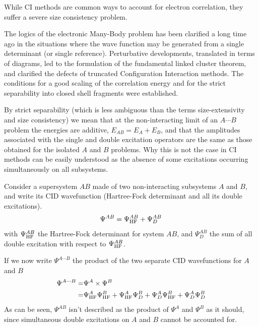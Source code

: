 \documentclass[./thesis.tex]{subfiles}
\begin{document}
\label{chap:exp_dressing}

While CI methods are common ways to account for electron correlation, they suffer a severe size consistency problem.


The logics of the electronic Many-Body problem has been clarified a long time
ago in the situations where  the  wave  function  may  be  generated  from  a
single  determinant  (or  single  reference).  Perturbative  developments,
translated  in  terms  of  diagrams,  led  to  the  formulation  of  the
fundamental  linked  cluster  theorem,\cite{Goldstone}  and  clarified  the  defects  of
truncated  Configuration Interaction  methods.  The  conditions  for  a  good
scaling  of  the  correlation  energy  and  for  the  strict separability  into
closed  shell  fragments  were  established.

By  strict  separability  (which
is  less ambiguous than the terms size-extensivity and size consistency) we
mean that at the non-interacting limit of an $A\cdots B$ problem the energies are
additive, $E_{AB} = E_A+E_B$, and that the amplitudes associated with the single
and  double excitation operators  are  the  same  as  those  obtained  for  the  isolated  $A$
and  $B$  problems.  
Why this is not the case in CI methods can be easily understood as the absence of some excitations occurring simultaneously on all subsystems.

Consider a supersystem $AB$ made of two non-interacting subsystems $A$ and $B$, and write its CID wavefunction (Hartree-Fock determinant and all its double excitations).
\begin{equation}
\Psi^{AB} = \Psi_{{\text{HF}}}^{AB} + \Psi_{D}^{AB}
\end{equation}
with $\Psi_{{\text{HF}}}^{AB}$ the Hartree-Fock determinant for system $AB$, and $\Psi_{D}^{AB}$ the sum of all double excitation with respect to $\Psi_{{\text{HF}}}^{AB}$.

If we now write $\Psi^{A\cdots B}$ the product of the two separate CID wavefunctions for $A$ and $B$
\begin{align}
\Psi^{A\cdots B} = & \Psi^A  \times \Psi^B \\
 = & \Psi_{{\text{HF}}}^A\Psi_{{\text{HF}}}^B  + \Psi_{{\text{HF}}}^A\Psi_{D}^B + \Psi_{D}^A\Psi_{{\text{HF}}}^B + \Psi_{D}^A \Psi_{D}^B 
\end{align}
As can be seen, $\Psi^{AB}$ isn't described as the product of $\Psi^A$ and $\Psi^B$ as it should, since simultaneous double excitations on $A$ and $B$ cannot be accounted for.

\end{document}
